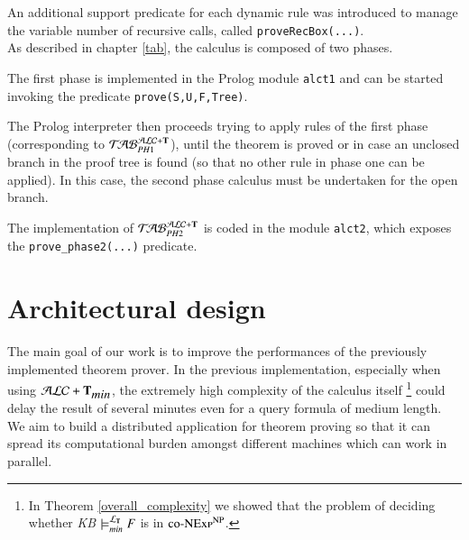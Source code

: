 \documentclass[a4paper, 11pt, oneside]{elsarticle}
\newcommand{\tip}{{\bf T}}
\newcommand{\alctmin}{\mathcal{ALC}+\tip_{\mbox{\em min}}}
\newcommand{\ellet} {\mathcal{L}_{\bf T}}
\newcommand{\primo}{\mathrel{{\mathcal{T}\!\mathcal{AB}}}_{PH 1}^{\mathcal{ALC}+\mbox{\scriptsize $\tip$}}}
\newcommand{\secondo}{\mathrel{{\mathcal{T}\!\mathcal{AB}}}_{PH 2}^{\mathcal{ALC}+\mbox{\scriptsize $\tip$}}}
\begin{document}
\newpage

An additional support predicate for each dynamic rule was introduced to manage the variable number of recursive calls, called \texttt{proveRecBox(...)}.\\

As described in chapter \ref{tab}, the calculus is composed of two phases.

The first phase is implemented in the Prolog module \texttt{alct1} and can be started invoking the predicate \texttt{prove(S,U,F,Tree)}.

The Prolog interpreter then proceeds trying to apply rules of the first phase (corresponding to $\primo$), until the theorem is proved or in case an unclosed branch in the proof tree is found (so that no other rule in phase one can be applied). 
In this case, the second phase calculus must be undertaken for the open branch.

The implementation of $\secondo$ is coded in the module \texttt{alct2}, which exposes the \texttt{prove\_phase2(...)} predicate.

\newpage




























\section{Architectural design}\label{arch}

The main goal of our work is to improve the performances of the previously implemented theorem prover.
In the previous implementation, especially when using $\alctmin$, the extremely high complexity of the calculus itself
\footnote{In Theorem \ref{overall_complexity} we showed that the problem of deciding whether \emph{KB} $\models_{min}^{\ellet} F$ is in $\textsc{co-NExp}^\textsc{NP}$.}
could delay the result of several minutes even for a query formula of medium length.
We aim to build a distributed application for theorem proving so that it can spread its computational burden amongst different machines which can work in parallel.
\end{document}
